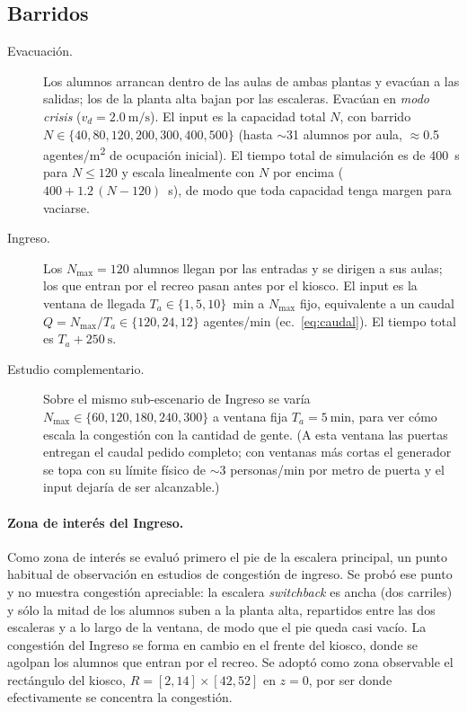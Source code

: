 \documentclass[11pt,a4paper]{article}
\begin{document}
\subsection*{Barridos}

\begin{description}
  \item[Evacuación.] Los alumnos arrancan dentro de las aulas de ambas plantas y evacúan a las
  salidas; los de la planta alta bajan por las escaleras. Evacúan en \emph{modo crisis}
  ($v_d=\SI{2.0}{\metre\per\second}$). El input es la capacidad total $N$, con barrido
  $N\in\{40,80,120,200,300,400,500\}$ (hasta $\sim$31 alumnos por aula, $\approx$0.5
  agentes/\si{\metre\squared} de ocupación inicial). El tiempo total de simulación es de
  \SI{400}{\second} para $N\le 120$ y escala linealmente con $N$ por encima
  ($400 + 1.2\,(N-120)$~\si{\second}), de modo que toda capacidad tenga margen para vaciarse.
  \item[Ingreso.] Los $N_{\max}=120$ alumnos llegan por las entradas y se dirigen a sus aulas;
  los que entran por el recreo pasan antes por el kiosco. El input es la ventana de llegada
  $T_a\in\{1,5,10\}$~min a $N_{\max}$ fijo, equivalente a un caudal
  $Q=N_{\max}/T_a\in\{120,24,12\}$ agentes/min (ec.~\ref{eq:caudal}). El tiempo total es
  $T_a + \SI{250}{\second}$.
  \item[Estudio complementario.] Sobre el mismo sub-escenario de Ingreso se varía $N_{\max}\in
  \{60,120,180,240,300\}$ a ventana fija $T_a=\SI{5}{\minute}$, para ver cómo escala la
  congestión con la cantidad de gente. (A esta ventana las puertas entregan el caudal pedido
  completo; con ventanas más cortas el generador se topa con su límite físico de
  $\sim$3 personas/min por metro de puerta y el input dejaría de ser alcanzable.)
\end{description}

\paragraph{Zona de interés del Ingreso.}
Como zona de interés se evaluó primero el pie de la escalera principal, un punto habitual de
observación en estudios de congestión de ingreso. Se probó ese punto y no muestra congestión
apreciable: la escalera \emph{switchback} es ancha (dos carriles) y sólo la mitad de los alumnos
suben a la planta alta, repartidos entre las dos escaleras y a lo largo de la ventana, de modo
que el pie queda casi vacío. La congestión del Ingreso se forma en cambio en el frente del
kiosco, donde se agolpan los alumnos que entran por el recreo. Se adoptó como zona observable el
rectángulo del kiosco, $R=[2,14]\times[42,52]$ en $z=0$, por ser donde efectivamente se concentra
la congestión.
\end{document}
